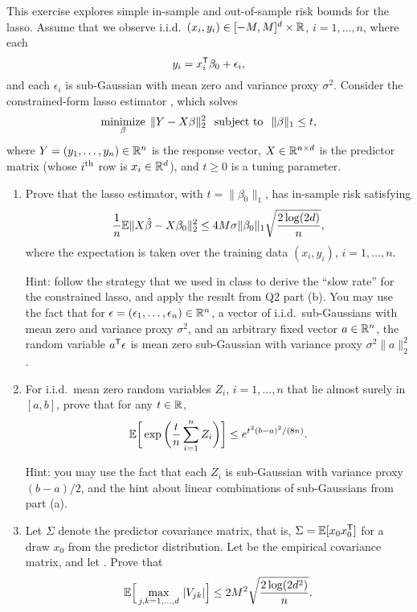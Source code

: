 \documentclass{article}
\begin{document}
\def\hSigma{\hat\Sigma}

This exercise explores simple in-sample and out-of-sample risk bounds for the
lasso. Assume that we observe i.i.d.\ $(x_i,y_i) \in [-M,M]^d \times \mathbb{R}$,
$i=1,\dots,n$, where each   
\[
y_i = x_i^{\mathsf{T}} \beta_0 + \epsilon_i,
\]
and each $\epsilon_i$ is sub-Gaussian with mean zero and variance proxy
$\sigma^2$. Consider the constrained-form lasso estimator \smash{$\hbeta$}, 
which solves  
\[
\mathop{\mathrm{minimize}}_\beta \; \|Y - X\beta\|_2^2 \;\; \mathop{\mathrm{subject\,\,to}} \;\; \|\beta\|_1 \leq t,    
\]
where $Y = (y_1,\dots,y_n) \in \mathbb{R}^n$ is the response vector, $X \in \mathbb{R}^{n \times
  d}$ is the predictor matrix (whose $i^{\text{th}}$ row is $x_i \in \mathbb{R}^d$), and $t \geq
0$ is a tuning parameter.

\begin{enumerate}[label=(\alph*)]
\item Prove that the lasso estimator, with $t=\|\beta_0\|_1$, has in-sample risk
  satisfying 
  \marginpar{\small [3 pts]}
  \[
  \frac{1}{n} \mathbb{E} \|X\hat{\beta} - X\beta_0\|_2^2 \leq 4M \sigma \|\beta_0\|_1
  \sqrt{\frac{2 \log(2d)}{n}},  
  \]
  where the expectation is taken over the training data $(x_i,y_i)$,
  $i=1,\dots,n$. 

  Hint: follow the strategy that we used in class to derive the ``slow rate''
  for the constrained lasso, and apply the result from Q2 part (b). You may use 
  the fact that for $\epsilon = (\epsilon_1,\dots,\epsilon_n) \in \mathbb{R}^n$, a
  vector of i.i.d.\ sub-Gaussians with mean zero and variance proxy $\sigma^2$, 
  and an arbitrary fixed vector $a \in \mathbb{R}^n$, the random variable $a^{\mathsf{T}}
  \epsilon$ is mean zero sub-Gaussian with variance proxy $\sigma^2
  \|a\|_2^2$. 

\item For i.i.d.\ mean zero random variables $Z_i$, $i=1,\dots,n$ that lie
  almost surely in $[a,b]$, prove that for any $t \in \mathbb{R}$, 
  \marginpar{\small [2 pts]}
  \[
  \mathbb{E} \bigg[\exp \bigg(\frac{t}{n} \sum_{i=1}^n Z_i \bigg)\bigg] \leq
  e^{t^2(b-a)^2/(8n)}.  
  \]

  Hint: you may use the fact that each $Z_i$ is sub-Gaussian with variance proxy
  $(b-a)/2$, and the hint about linear combinations of sub-Gaussians from part
  (a).  

\item Let $\Sigma$ denote the predictor covariance matrix, that is,
  $\Sigma = \mathbb{E}[x_0x_0^{\mathsf{T}}]$ for a draw $x_0$ from the predictor distribution. Let
  \smash{$\hSigma = X^\T X/n$} be the empirical covariance matrix, and let
  \smash{$V = \hSigma-\Sigma$}. Prove that    
  \marginpar{\small [2 pts]}
  \[
  \mathbb{E}\Big[ \max_{j,k=1,\dots,d} \, |V_{jk}| \Big] \leq 2M^2 \sqrt{\frac{2
      \log(2d^2)}{n}}.  
  \]


\end{enumerate}
\end{document}
